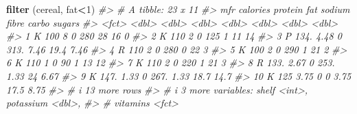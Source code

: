 \documentclass[
]{book}
\newenvironment{Shaded}{\begin{snugshade}}{\end{snugshade}}
\newcommand{\CommentTok}[1]{\textcolor[rgb]{0.56,0.35,0.01}{\textit{#1}}}
\newcommand{\DecValTok}[1]{\textcolor[rgb]{0.00,0.00,0.81}{#1}}
\newcommand{\FunctionTok}[1]{\textcolor[rgb]{0.13,0.29,0.53}{\textbf{#1}}}
\newcommand{\NormalTok}[1]{#1}
\newcommand{\SpecialCharTok}[1]{\textcolor[rgb]{0.81,0.36,0.00}{\textbf{#1}}}
\begin{document}
\begin{Shaded}
\begin{Highlighting}[]
\FunctionTok{filter}\NormalTok{ (cereal, fat}\SpecialCharTok{\textless{}}\DecValTok{1}\NormalTok{)}
\CommentTok{\#\textgreater{} \# A tibble: 23 x 11}
\CommentTok{\#\textgreater{}    mfr   calories protein   fat sodium fibre carbo sugars}
\CommentTok{\#\textgreater{}    \textless{}fct\textgreater{}    \textless{}dbl\textgreater{}   \textless{}dbl\textgreater{} \textless{}dbl\textgreater{}  \textless{}dbl\textgreater{} \textless{}dbl\textgreater{} \textless{}dbl\textgreater{}  \textless{}dbl\textgreater{}}
\CommentTok{\#\textgreater{}  1 K         100     8        0   280  28     16     0   }
\CommentTok{\#\textgreater{}  2 K         110     2        0   125   1     11    14   }
\CommentTok{\#\textgreater{}  3 P         134.    4.48     0   313.  7.46  19.4   7.46}
\CommentTok{\#\textgreater{}  4 R         110     2        0   280   0     22     3   }
\CommentTok{\#\textgreater{}  5 K         100     2        0   290   1     21     2   }
\CommentTok{\#\textgreater{}  6 K         110     1        0    90   1     13    12   }
\CommentTok{\#\textgreater{}  7 K         110     2        0   220   1     21     3   }
\CommentTok{\#\textgreater{}  8 R         133.    2.67     0   253.  1.33  24     6.67}
\CommentTok{\#\textgreater{}  9 K         147.    1.33     0   267.  1.33  18.7  14.7 }
\CommentTok{\#\textgreater{} 10 K         125     3.75     0     0   3.75  17.5   8.75}
\CommentTok{\#\textgreater{} \# i 13 more rows}
\CommentTok{\#\textgreater{} \# i 3 more variables: shelf \textless{}int\textgreater{}, potassium \textless{}dbl\textgreater{},}
\CommentTok{\#\textgreater{} \#   vitamins \textless{}fct\textgreater{}}


\end{Highlighting}
\end{Shaded}
\end{document}
